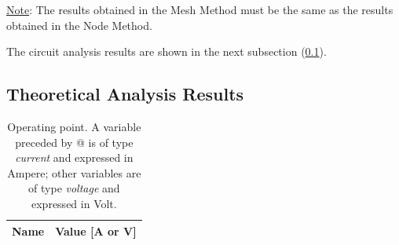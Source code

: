 \underline{Note}: The results obtained in the Mesh Method must be the same as the results obtained in the Node Method.\par

The circuit analysis results are shown in the next subsection (\ref{subsec:Theoretical Analysis Results}).


\subsection{Theoretical Analysis Results}
\label{subsec:Theoretical Analysis Results}
\begin{table} [H]
  \centering
  \begin{tabular}{|l|r|}
    \hline    
    {\bf Name} & {\bf Value [A or V]} \\ \hline
    
  \end{tabular}
  \caption{Operating point. A variable preceded by @ is of type {\em current}
    and expressed in Ampere; other variables are of type {\it voltage} and expressed in
    Volt.}
  \label{tab:op_analysis}
\end{table}


